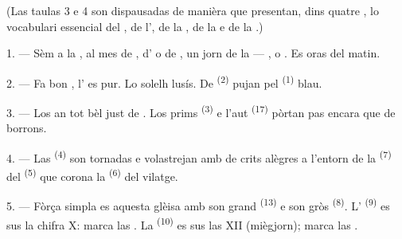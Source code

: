 
\VUsaut{3.0mm}
\VUsaut{1.6mm}
\VUsaut{3.4mm}

(Las taulas 3 e 4 son dispausadas de manièra que presentan, dins quatre
, lo vocabulari essencial del , de
l', de la , de la  e de la
.)
\VUsaut{4.0mm}

\VUsaut{3.0mm}

\VUsaut{2.4mm}

\VUsaut{3.0mm}

1. --- Sèm a la , al mes de , d' o de
, un jorn de la  --- ,
 o . Es  oras del matin.

2. --- Fa bon , l' es pur. Lo solelh lusís. De
 \textsuperscript{(2)} pujan pel 
\textsuperscript{(1)} blau.

3. --- Los  an tot bèl just de . Los prims
 \textsuperscript{(3)} e l'aut 
\textsuperscript{(17)} pòrtan pas encara que de borrons.

4. --- Las  \textsuperscript{(4)} son tornadas e volastrejan amb
de crits alègres a l'entorn de la  \textsuperscript{(7)} del
 \textsuperscript{(5)} que corona la 
\textsuperscript{(6)} del vilatge.

\VUsaut{3.4mm}
\VUsaut{3.0mm}

5. --- Fòrça simpla es aquesta glèisa amb son grand 
\textsuperscript{(13)} e son gròs  \textsuperscript{(8)}.
L' \textsuperscript{(9)} es sus la chifra X: marca las
. La  \textsuperscript{(10)} es sus las XII
(miègjorn); marca las .

